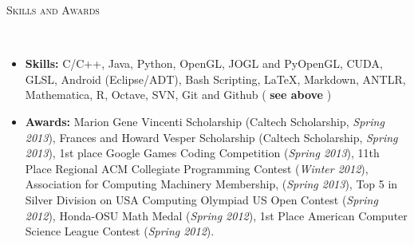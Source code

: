 \documentclass[9pt]{article}
\newenvironment{changemargin}[2]{%
  \begin{list}{}{%
    \setlength{\topsep}{0pt}%
    \setlength{\leftmargin}{#1}%
    \setlength{\rightmargin}{#2}%
    \setlength{\listparindent}{\parindent}%
    \setlength{\itemindent}{\parindent}%
    \setlength{\parsep}{\parskip}%
  }%
  \item[]}{\end{list}
}
\newcommand{\lineover}{
	\begin{changemargin}{-0.05in}{-0.05in}
		\vspace*{-8pt}
		\hrulefill \\
		\vspace*{-2pt}
	\end{changemargin}
}
\newcommand{\header}[1]{
	\begin{changemargin}{-0.5in}{-0.5in}
		\scshape{#1}\\
  	\lineover
	\end{changemargin}
}
\newenvironment{body} {
	\vspace*{-16pt}
	\begin{changemargin}{-0.25in}{-0.5in}
  }	
	{\end{changemargin}
}
\begin{document}
\header{Skills and Awards}
\smallskip
\begin{body}
	\vspace{14pt}
	
	\begin{itemize} \itemsep -0pt
	
	\item \textbf{Skills:} C/C++, Java, Python, OpenGL, JOGL and PyOpenGL, CUDA, GLSL, Android (Eclipse/ADT), Bash Scripting, \LaTeX, Markdown, ANTLR,  Mathematica, R, Octave, SVN, Git and Github ( \textbf{see above} )\\
	\medskip
	\item \textbf{Awards:} Marion Gene Vincenti Scholarship (Caltech Scholarship, \emph{Spring 2013}), 
	Frances and Howard Vesper Scholarship (Caltech Scholarship, \emph{Spring 2013}), 
	1st place Google Games Coding Competition (\emph{Spring 2013}), 
	11th Place Regional ACM Collegiate Programming Contest (\emph{Winter 2012}), 
	Association for Computing Machinery Membership, (\emph{Spring 2013}),
	Top 5 in Silver Division on USA Computing Olympiad US Open Contest (\emph{Spring 2012}),
	Honda-OSU Math Medal (\emph{Spring 2012}),
	1st Place American Computer Science League Contest (\emph{Spring 2012}).
	\end{itemize}
\end{body}
\end{document}
